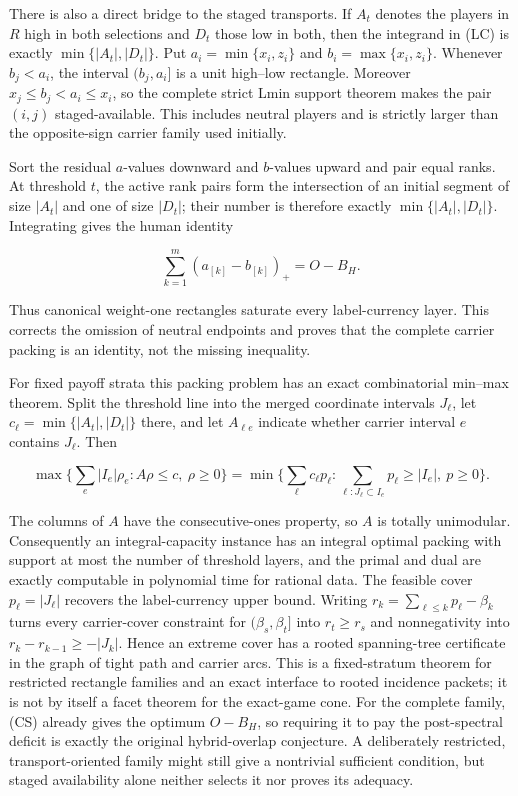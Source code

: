 \documentclass[11pt]{article}
\begin{document}
There is also a direct bridge to the staged transports.  If $A_t$ denotes
the players in $R$ high in both selections and $D_t$ those low in both, then
the integrand in (LC) is exactly $\min\{|A_t|,|D_t|\}$.  Put
$a_i=\min\{x_i,z_i\}$ and $b_i=\max\{x_i,z_i\}$.  Whenever $b_j<a_i$, the
interval $(b_j,a_i]$ is a unit high--low rectangle.  Moreover
$x_j\le b_j<a_i\le x_i$, so the complete strict Lmin support theorem makes
the pair $(i,j)$ staged-available.  This includes neutral players and is
strictly larger than the opposite-sign carrier family used initially.

Sort the residual $a$-values downward and $b$-values upward and pair equal
ranks.  At threshold $t$, the active rank pairs form the intersection of an
initial segment of size $|A_t|$ and one of size $|D_t|$; their number is
therefore exactly $\min\{|A_t|,|D_t|\}$.  Integrating gives the human identity

\[
 \sum_{k=1}^{m}(a_{[k]}-b_{[k]})_+=O-B_H. \tag{CS}
\]

Thus canonical weight-one rectangles saturate every label-currency layer.
This corrects the omission of neutral endpoints and proves that the complete
carrier packing is an identity, not the missing inequality.

For fixed payoff strata this packing problem has an exact combinatorial
min--max theorem.  Split the threshold line into the merged coordinate
intervals $J_\ell$, let $c_\ell=\min\{|A_t|,|D_t|\}$ there, and let
$A_{\ell e}$ indicate whether carrier interval $e$ contains $J_\ell$.
Then

\[
 \max\{\textstyle\sum_e |I_e|\rho_e:A\rho\le c,\ \rho\ge0\}
 =\min\{\textstyle\sum_\ell c_\ell p_\ell:
          \sum_{\ell:J_\ell\subset I_e}p_\ell\ge |I_e|,\ p\ge0\}.
\]

The columns of $A$ have the consecutive-ones property, so $A$ is totally
unimodular.  Consequently an integral-capacity instance has an integral
optimal packing with support at most the number of threshold layers, and the
primal and dual are exactly computable in polynomial time for rational data.
The feasible cover $p_\ell=|J_\ell|$ recovers the label-currency upper bound.
Writing $r_k=\sum_{\ell\le k}p_\ell-\beta_k$ turns every carrier-cover
constraint for $(\beta_s,\beta_t]$ into $r_t\ge r_s$ and nonnegativity into
$r_k-r_{k-1}\ge-|J_k|$.  Hence an extreme cover has a rooted spanning-tree
certificate in the graph of tight path and carrier arcs.
This is a fixed-stratum theorem for restricted rectangle families and an
exact interface to rooted incidence packets; it is not by itself a facet
theorem for the exact-game cone.  For the complete family, (CS) already gives
the optimum $O-B_H$, so requiring it to pay the post-spectral deficit is
exactly the original hybrid-overlap conjecture.  A deliberately restricted,
transport-oriented family might still give a nontrivial sufficient condition,
but staged availability alone neither selects it nor proves its adequacy.
\end{document}
